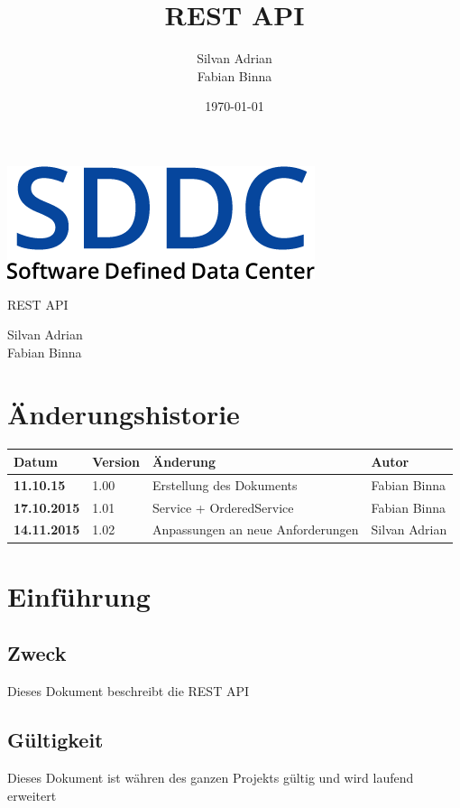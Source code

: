 \documentclass[11pt]{scrartcl}
\title{REST API}
\author{Silvan Adrian \\ Fabian Binna}
\date{\today{}}
\begin{document}
\def\arraystretch{1.5}
\begin{titlepage}
\begin{center}
\vspace{10em}
\includegraphics[scale=2]{SDDC}
\vspace{10em}
\end{center}
\begin{center}
\huge {REST API}
\end{center}
\begin{center}
\vspace{10em}
\LARGE {Silvan Adrian} \\
\LARGE {Fabian Binna}
\end{center}

\end{titlepage}

\newpage
\section{Änderungshistorie}
\begin{tabularx}{\linewidth}{l l X l}
\textbf{Datum} & \textbf{Version} & \textbf{Änderung}  & \textbf{Autor} \\
\hline
\textbf{11.10.15} & 1.00 & Erstellung des Dokuments & Fabian Binna \\
\textbf{17.10.2015} & 1.01 & Service + OrderedService & Fabian Binna\\
\textbf{14.11.2015} & 1.02 & Anpassungen an neue Anforderungen & Silvan Adrian\\
\end{tabularx}

\newpage
\tableofcontents
\newpage

\section{Einführung}
\subsection{Zweck}
Dieses Dokument beschreibt die REST API
\subsection{Gültigkeit}
Dieses Dokument ist währen des ganzen Projekts gültig und wird laufend erweitert
\end{document}
